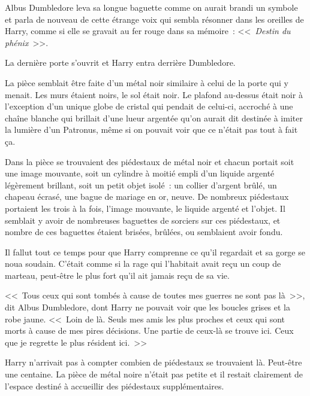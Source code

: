 Albus Dumbledore leva sa longue baguette comme on aurait brandi un symbole et parla de nouveau de cette étrange voix qui sembla résonner dans les oreilles de Harry, comme si elle se gravait au fer rouge dans sa mémoire~: <<~\emph{Destin du phénix}~>>.

La dernière porte s'ouvrit et Harry entra derrière Dumbledore.

La pièce semblait être faite d'un métal noir similaire à celui de la porte qui y menait. Les murs étaient noirs, le sol était noir. Le plafond au-dessus était noir à l'exception d'un unique globe de cristal qui pendait de celui-ci, accroché à une chaîne blanche qui brillait d'une lueur argentée qu'on aurait dit destinée à imiter la lumière d'un Patronus, même si on pouvait voir que ce n'était pas tout à fait ça.

Dans la pièce se trouvaient des piédestaux de métal noir et chacun portait soit une image mouvante, soit un cylindre à moitié empli d'un liquide argenté légèrement brillant, soit un petit objet isolé~: un collier d'argent brûlé, un chapeau écrasé, une bague de mariage en or, neuve. De nombreux piédestaux portaient les trois à la fois, l'image mouvante, le liquide argenté et l'objet. Il semblait y avoir de nombreuses baguettes de sorciers sur ces piédestaux, et nombre de ces baguettes étaient brisées, brûlées, ou semblaient avoir fondu.

Il fallut tout ce temps pour que Harry comprenne ce qu'il regardait et sa gorge se noua soudain. C'était comme si la rage qui l'habitait avait reçu un coup de marteau, peut-être le plus fort qu'il ait jamais reçu de sa vie.

<<~Tous ceux qui sont tombés à cause de toutes mes guerres ne sont pas là~>>, dit Albus Dumbledore, dont Harry ne pouvait voir que les boucles grises et la robe jaune. <<~Loin de là. Seuls mes amis les plus proches et ceux qui sont morts à cause de mes pires décisions. Une partie de ceux-là se trouve ici. Ceux que je regrette le plus résident ici.~>>

Harry n'arrivait pas à compter combien de piédestaux se trouvaient là. Peut-être une centaine. La pièce de métal noire n'était pas petite et il restait clairement de l'espace destiné à accueillir des piédestaux supplémentaires.


